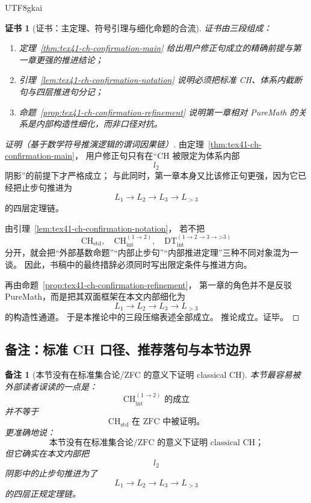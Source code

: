 \documentclass[12pt]{article}
\newtheorem{remark}{备注}[section]
\newtheorem{Certificate}{证书}[section]
\newcommand{\CHstd}{\mathrm{CH}_{\mathrm{std}}}
\newcommand{\CHint}{\mathrm{CH}_{\mathrm{int}}}
\newcommand{\DTint}{\mathrm{DT}_{\mathrm{int}}}
\begin{document}
\begin{CJK*}{UTF8}{gkai}
\begin{Certificate}[证书：主定理、符号引理与细化命题的合流]
\label{cert:tex41-ch-confirmation-final}
证书由三段组成：
\begin{enumerate}
  \item 定理~\ref{thm:tex41-ch-confirmation-main} 给出用户修正句成立的精确前提与第一章更强的推进结论；
  \item 引理~\ref{lem:tex41-ch-confirmation-notation} 说明必须把标准 CH、体系内截断句与四层推进句分记；
  \item 命题~\ref{prop:tex41-ch-confirmation-refinement} 说明第一章相对 PureMath 的关系是内部构造性细化，而非口径对抗。
\end{enumerate}
\end{Certificate}

\begin{proof}[证明（基于数学符号推演逻辑的谓词因果链）]
由定理~\ref{thm:tex41-ch-confirmation-main}，
用户修正句只有在“CH 被限定为体系内部
\[
  l_2
\]
阴影”的前提下才严格成立；
与此同时，第一章本身又比该修正句更强，因为它已经把止步句推进为
\[
  L_1\to L_2\to L_3\to L_{>3}
\]
的四层定理链。

由引理~\ref{lem:tex41-ch-confirmation-notation}，
若不把
\[
  \CHstd,\quad \CHint^{(1\to2)},\quad \DTint^{(1\to2\to3\to\text{>3})}
\]
分开，就会把“外部基数命题”“内部止步句”“内部推进定理”三种不同对象混为一谈。
因此，书稿中的最终措辞必须同时写出限定条件与推进方向。

再由命题~\ref{prop:tex41-ch-confirmation-refinement}，
第一章的角色并不是反驳 PureMath，而是把其双面框架在本文内部细化为
\[
  L_1\to L_2\to L_3\to L_{>3}
\]
的构造性通道。
于是本推论中的三段压缩表述全部成立。
推论成立。证毕。
\end{proof}

\subsection{备注：标准 CH 口径、推荐落句与本节边界}
\label{subsec:tex41-ch-confirmation-remarks}

\begin{remark}[本节没有在标准集合论/ZFC 的意义下证明 classical CH]
本节最容易被外部读者误读的一点是：
\[
  \CHint^{(1\to2)}
  \text{ 的成立}
\]
并不等于
\[
  \CHstd
  \text{ 在 ZFC 中被证明。}
\]
更准确地说：
\[
\boxed{
  \text{本节没有在标准集合论/ZFC 的意义下证明 classical CH；}
}
\]
但它确实在本文内部把
\[
  l_2
\]
阴影中的止步句推进为了
\[
  L_1\to L_2\to L_3\to L_{>3}
\]
的四层正规定理链。
\end{remark}


\end{CJK*}
\end{document}
